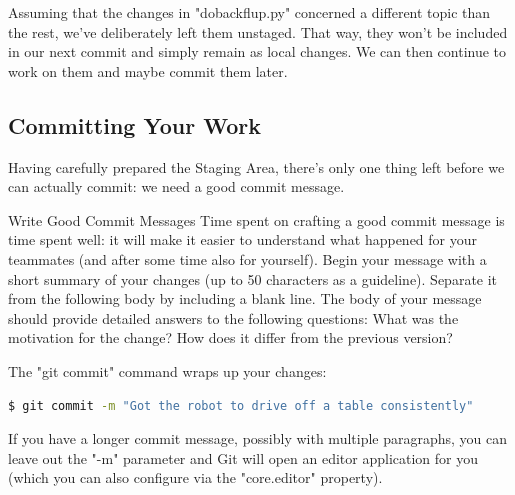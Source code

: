 \documentclass{article}
\begin{document}
Assuming that the changes in "dobackflup.py" concerned a different topic than the rest, we've deliberately left them unstaged. That way, they won't be included in our next commit and simply remain as local changes. We can then continue to work on them and maybe commit them later.
\subsection{Committing Your Work}
Having carefully prepared the Staging Area, there's only one thing left before we can actually commit: we need a good commit message.
\begin{golden-rule}Write Good Commit Messages
\newline\newline
Time spent on crafting a good commit message is time spent well: it will make it easier to understand what happened for your teammates (and after some time also for yourself).
\newline\newline
Begin your message with a short summary of your changes (up to 50 characters as a guideline). Separate it from the following body by including a blank line. The body of your message should provide detailed answers to the following questions: What was the motivation for the change? How does it differ from the previous version?
\end{golden-rule}

The "git commit" command wraps up your changes:
\begin{lstlisting}[language=bash]
$ git commit -m "Got the robot to drive off a table consistently"
\end{lstlisting}

If you have a longer commit message, possibly with multiple paragraphs, you can leave out the "-m" parameter and Git will open an editor application for you (which you can also configure via the "core.editor" property).
\end{document}
